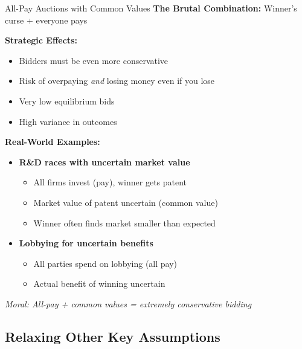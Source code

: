 \documentclass[xcolor={x11names}]{beamer}
\begin{document}
\begin{frame}{All-Pay Auctions with Common Values}
\textbf{The Brutal Combination:} Winner's curse + everyone pays


\textbf{Strategic Effects:}
\begin{itemize}
  \item Bidders must be even more conservative
  \item Risk of overpaying \textit{and} losing money even if you lose
  \item Very low equilibrium bids
  \item High variance in outcomes
\end{itemize}


\textbf{Real-World Examples:}
\begin{itemize}
  \item \textbf{R\&D races with uncertain market value}
  \begin{itemize}
    \item All firms invest (pay), winner gets patent
    \item Market value of patent uncertain (common value)
    \item Winner often finds market smaller than expected
  \end{itemize}
  \item \textbf{Lobbying for uncertain benefits}
  \begin{itemize}
    \item All parties spend on lobbying (all pay)
    \item Actual benefit of winning uncertain
  \end{itemize}
\end{itemize}

\vspace{0.2cm}
\textit{Moral: All-pay + common values = extremely conservative bidding}
\end{frame}

\subsection{Relaxing Other Key Assumptions}
\end{document}
